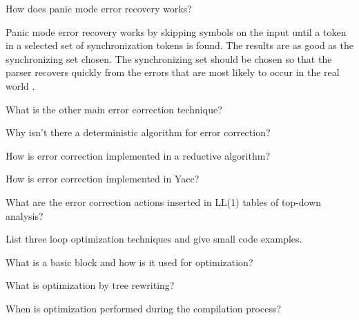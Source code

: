 \begin{Exercise}[difficulty=1]
How does panic mode error recovery works?
\end{Exercise}

\begin{Answer}
Panic mode error recovery works by skipping symbols on the input until a token in a selected set of synchronization tokens is found.
The results are as good as the synchronizing set chosen.
The synchronizing set should be chosen so that the parser recovers quickly from the errors that are most likely to occur in the real world \cite[p.~229]{compilers-aho-2007}.
\end{Answer}

\begin{Exercise}
What is the other main error correction technique?
\end{Exercise}

\begin{Exercise}
Why isn't there a deterministic algorithm for error correction?
\end{Exercise}

\begin{Exercise}
How is error correction implemented in a reductive algorithm?
\end{Exercise}

\begin{Exercise}[difficulty=1]
How is error correction implemented in Yacc?
\end{Exercise}

\begin{Exercise}
What are the error correction actions inserted in LL(1) tables of top-down analysis?
\end{Exercise}

\begin{Exercise}[difficulty=1]
List three loop optimization techniques and give small code examples.
\end{Exercise}

\begin{Exercise}[difficulty=1]
What is a basic block and how is it used for optimization?
\end{Exercise}

\begin{Exercise}
What is optimization by tree rewriting?
\end{Exercise}

\begin{Exercise}
When is optimization performed during the compilation process?
\end{Exercise}

